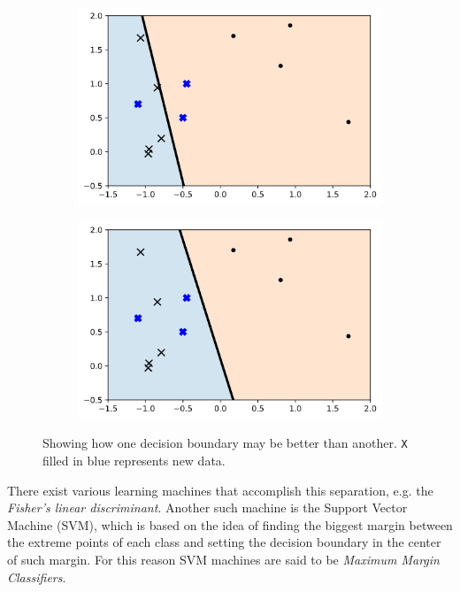 \begin{figure}[H]
    \centering
    \begin{subfigure}[b]{0.4\linewidth}
        \includegraphics[width=\linewidth]{img/ch4/boundrybad.png}
    \end{subfigure}
    \begin{subfigure}[b]{0.4\linewidth}
        \includegraphics[width=\linewidth]{img/ch4/boundrygood.png}
    \end{subfigure}
    \caption{Showing how one decision boundary may be better than another. \texttt{X} filled in blue represents new data.}
    \label{fig:ch4.sep1}
\end{figure}

There exist various learning machines that accomplish this separation, e.g. the \emph{Fisher’s linear discriminant}. Another such machine is the Support Vector Machine (SVM), which is based on the idea of finding the biggest margin between the extreme points of each class and setting the decision boundary in the center of such margin. For this reason SVM machines are said to be \emph{Maximum Margin Classifiers}.

